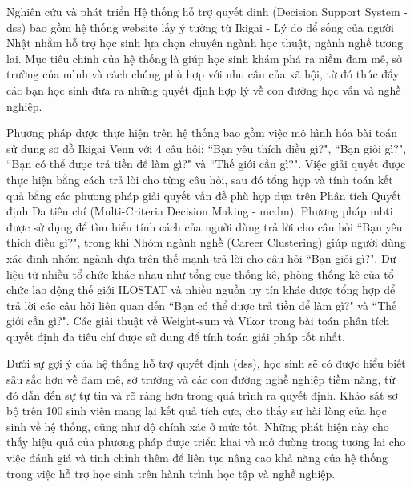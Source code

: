 Nghiên cứu và phát triển Hệ thống hỗ trợ quyết định (Decision Support System - \acrshort{dss}) bao gồm hệ thống website lấy ý tưởng từ Ikigai - Lý do để sống của người Nhật nhằm hỗ trợ học sinh lựa chọn chuyên ngành học thuật, ngành nghề tương lai. Mục tiêu chính của hệ thống là giúp học sinh khám phá ra niềm đam mê, sở trường của mình và cách chúng phù hợp với nhu cầu của xã hội, từ đó thúc đẩy các bạn học sinh đưa ra những quyết định hợp lý về con đường học vấn và nghề nghiệp.

Phương pháp được thực hiện trên hệ thống bao gồm việc mô hình hóa bài toán sử dụng sơ đồ Ikigai Venn với 4 câu hỏi: ``Bạn yêu thích điều gì?", ``Bạn giỏi gì?", ``Bạn có thể được trả tiền để làm gì?" và ``Thế giới cần gì?". Việc giải quyết được thực hiện bằng cách trả lời cho từng câu hỏi, sau đó tổng hợp và tính toán kết quả bằng các phương pháp giải quyết vấn đề phù hợp dựa trên Phân tích Quyết định Đa tiêu chí (Multi-Criteria Decision Making - \acrshort{mcdm}). Phương pháp \acrfull{mbti} được sử dụng để tìm hiểu tính cách của người dùng trả lời cho câu hỏi ``Bạn yêu thích điều gì?", trong khi Nhóm ngành nghề (Career Clustering) giúp người dùng xác đinh nhóm ngành dựa trên thế mạnh trả lời cho câu hỏi ``Bạn giỏi gì?". Dữ liệu từ nhiều tổ chức khác nhau như tổng cục thống kê, phòng thống kê của tổ chức lao động thế giới ILOSTAT và nhiều nguồn uy tín khác được tổng hợp để trả lời các câu hỏi liên quan đến ``Bạn có thể được trả tiền để làm gì?" và ``Thế giới cần gì?". Các giải thuật về Weight-sum và Vikor trong bài toán phân tích quyết định đa tiêu chí được sử dung để tính toán giải pháp tốt nhất.

Dưới sự gợi ý của hệ thống hỗ trợ quyết định (\acrshort{dss}), học sinh sẽ có được hiểu biết sâu sắc hơn về đam mê, sở trường và các con đường nghề nghiệp tiềm năng, từ đó dẫn đến sự tự tin và rõ ràng hơn trong quá trình ra quyết định. Khảo sát sơ bộ trên 100 sinh viên mang lại kết quả tích cực, cho thấy sự hài lòng của học sinh về hệ thống, cũng như độ chính xác ở mức tốt. Những phát hiện này cho thấy hiệu quả của phương pháp được triển khai và mở đường trong tương lai cho việc đánh giá và tinh chỉnh thêm để liên tục nâng cao khả năng của hệ thống trong việc hỗ trợ học sinh trên hành trình học tập và nghề nghiệp.